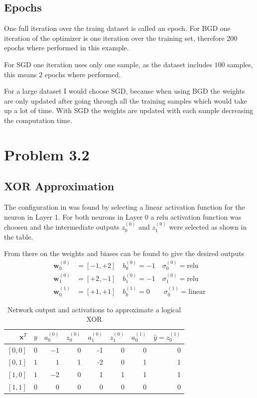 \documentclass[12pt,a4paper]{scrartcl}
\newcommand{\matr}[1]{\mathbf{#1}}
\begin{document}
	\subsection*{Epochs}
	One full iteration over the traing dataset is called an epoch.
	For BGD one iteration of the optimizer is one iteration over the training set, therefore $200$ epochs where performed in this example.
	
	For SGD one iteration uses only one sample, as the dataset includes $100$ samples, this means $2$ epochs where performed.
	
	For a large dataset I would choose SGD, because when using BGD the weights are only updated after going through all the training samples which would take up a lot of time. With SGD the weights are updated with each sample decreasing the computation time.
	
	
	\section*{Problem 3.2}
	
	\subsection*{XOR Approximation}
	
	The configuration in  was found by selecting a linear activation function for the neuron in Layer 1. For both neurons in Layer 0 a relu activation function was choosen and the intermediate outputs $z_0^{(0)}$ and $z_1^{(0)}$ were selected as shown in the table.
	
	From there on the weights and biases can be found to give the desired outputs
	\begin{align}
		\matr{w}_0^{(0)} &= [-1, +2]  \quad b_0^{(0)}=-1 \quad \sigma_0^{(0)} = \mathrm{relu} \\
		\matr{w}_1^{(0)} &= [+2, -1]  \quad b_1^{(0)}=-1 \quad \sigma_1^{(0)} = \mathrm{relu} \\
		\matr{w}_0^{(1)} &= [+1, +1]  \quad b_0^{(1)}=0 \qquad \sigma_0^{(1)} = \mathrm{linear}
	\end{align}

	\begin{table}[H]
		\centering
		\begin{tabular}{r|r|r|r|r|r|r|r}
			$\matr{x}^T$     & $y$ & $a_0^{(0)}$ & $z_0^{(0)}$ & $a_1^{(0)}$ & $z_1^{(0)}$ & $a_0^{(1)}$ & $\hat{y}=z_0^{(1)}$ \\ \hline
			$[0,0]$ & $0$ & $-1$        & 0         &   -1     & 0         & 0         & 0                 \\ \hline
			$[0,1]$ & $1$ & $1$         & 1         &   -2     & 0         & 1         & 1                 \\ \hline
			$[1,0]$ & $1$ & $-2$        & 0         &   1     & 1         & 1         & 1                 \\ \hline
			$[1,1]$ & $0$ & $0$         & 0         &   0     & 0         & 0         & 0                
		\end{tabular}
		\caption{Network output and activations to approximate a logical XOR}
		\label{tab:ex3_2_xor}
	\end{table}
	
\end{document}
